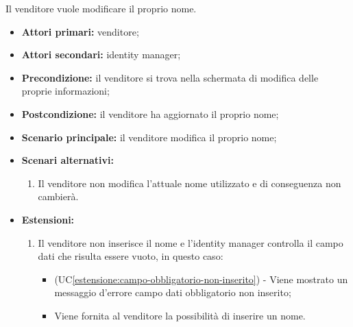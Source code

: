Il venditore vuole modificare il proprio nome.
\begin{itemize}
	\item \textbf{Attori primari:} venditore;
	\item \textbf{Attori secondari:} identity manager;
	\item \textbf{Precondizione:} il venditore si trova nella schermata di modifica delle proprie informazioni;
	\item \textbf{Postcondizione:} il venditore ha aggiornato il proprio nome;
	\item \textbf{Scenario principale:} il venditore modifica il proprio nome;
	\item \textbf{Scenari alternativi:}
	\begin{enumerate}[label=\lett]
		\item Il venditore non modifica l'attuale nome utilizzato e di conseguenza non cambierà.
	\end{enumerate}
	\item \textbf{Estensioni:}
	\begin{enumerate}[label=\lett]
		\item Il venditore non inserisce il nome e l'identity manager controlla il campo dati che risulta essere vuoto, in questo caso:
		\begin{itemize}
			\item (UC\ref{estensione:campo-obbligatorio-non-inserito}) - Viene mostrato un messaggio d'errore campo dati obbligatorio non inserito;
			\item Viene fornita al venditore la possibilità di inserire un nome.
		\end{itemize}
	\end{enumerate} 
\end{itemize}

\label{modifica-informazioni-venditore.cognome}


